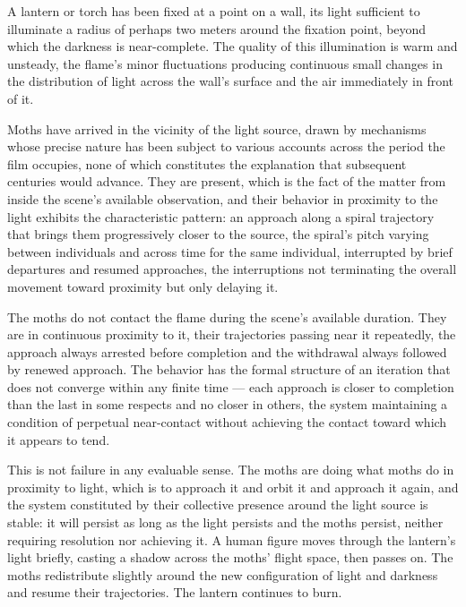 \documentclass[12pt, oneside]{article}
\newenvironment{action}{%
  \vspace{0.6em}%
  \noindent\ignorespaces%
}{%
  \par\vspace{0.6em}%
}
\begin{document}
\begin{action}
A lantern or torch has been fixed at a point on a wall, its light sufficient to illuminate a radius of perhaps two meters around the fixation point, beyond which the darkness is near-complete. The quality of this illumination is warm and unsteady, the flame's minor fluctuations producing continuous small changes in the distribution of light across the wall's surface and the air immediately in front of it.

Moths have arrived in the vicinity of the light source, drawn by mechanisms whose precise nature has been subject to various accounts across the period the film occupies, none of which constitutes the explanation that subsequent centuries would advance. They are present, which is the fact of the matter from inside the scene's available observation, and their behavior in proximity to the light exhibits the characteristic pattern: an approach along a spiral trajectory that brings them progressively closer to the source, the spiral's pitch varying between individuals and across time for the same individual, interrupted by brief departures and resumed approaches, the interruptions not terminating the overall movement toward proximity but only delaying it.
\end{action}

\begin{action}
The moths do not contact the flame during the scene's available duration. They are in continuous proximity to it, their trajectories passing near it repeatedly, the approach always arrested before completion and the withdrawal always followed by renewed approach. The behavior has the formal structure of an iteration that does not converge within any finite time --- each approach is closer to completion than the last in some respects and no closer in others, the system maintaining a condition of perpetual near-contact without achieving the contact toward which it appears to tend.

This is not failure in any evaluable sense. The moths are doing what moths do in proximity to light, which is to approach it and orbit it and approach it again, and the system constituted by their collective presence around the light source is stable: it will persist as long as the light persists and the moths persist, neither requiring resolution nor achieving it. A human figure moves through the lantern's light briefly, casting a shadow across the moths' flight space, then passes on. The moths redistribute slightly around the new configuration of light and darkness and resume their trajectories. The lantern continues to burn.
\end{action}
\end{document}
